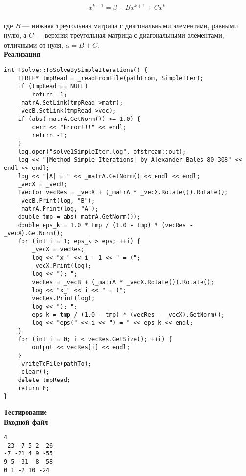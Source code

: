 $$
x^{k+1}=\beta + Bx^{k+1}+Cx^k
$$\\

где $B$ --- нижняя треугольная матрица с диагональными элементами, равными нулю, а $C$ --- верхняя треугольная матрица с диагональными элементами, отличными от нуля, $\alpha = B + C$.\\

\textbf{Реализация}

\begin{lstlisting}
int TSolve::ToSolveBySimpleIterations() {
    TFRFF* tmpRead = _readFromFile(pathFrom, SimpleIter);
    if (tmpRead == NULL)
        return -1;
    _matrA.SetLink(tmpRead->matr);
    _vecB.SetLink(tmpRead->vec);
    if (abs(_matrA.GetNorm()) >= 1.0) {
        cerr << "Error!!!" << endl;
        return -1;
    }
    log.open("solve1SimpleIter.log", ofstream::out);
    log << "|Method Simple Iterations| by Alexander Bales 80-308" << endl << endl;
    log << "|A| = " << _matrA.GetNorm() << endl << endl;
    _vecX = _vecB;    
    TVector vecRes = _vecX + (_matrA * _vecX.Rotate()).Rotate();    
    _vecB.Print(log, "B");    
    _matrA.Print(log, "A");    
    double tmp = abs(_matrA.GetNorm());
    double eps_k = 1.0 * tmp / (1.0 - tmp) * (vecRes - _vecX).GetNorm();	
    for (int i = 1; eps_k > eps; ++i) {
        _vecX = vecRes;
        log << "x_" << i - 1 << " = (";
        _vecX.Print(log);
        log << "); ";	    
        vecRes = _vecB + (_matrA * _vecX.Rotate()).Rotate();
        log << "x_" << i << " = (";
        vecRes.Print(log);
        log << "); ";
        eps_k = tmp / (1.0 - tmp) * (vecRes - _vecX).GetNorm();
        log << "eps(" << i << ") = " << eps_k << endl;
    }    
    for (int i = 0; i < vecRes.GetSize(); ++i) {
        output << vecRes[i] << endl;
    }
    _writeToFile(pathTo);
    _clear();  
    delete tmpRead; 
    return 0;
} 
\end{lstlisting}
\vspace{0.5cm}

\textbf{Тестирование}\\

\textbf{Входной файл}
\begin{verbatim}
4
-23 -7 5 2 -26
-7 -21 4 9 -55
9 5 -31 -8 -58
0 1 -2 10 -24
\end{verbatim}

